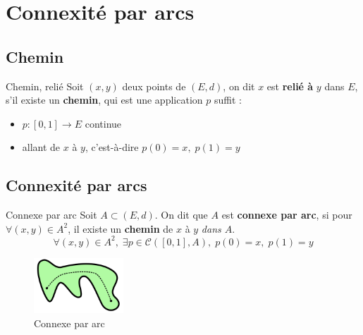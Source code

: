\newpage
\section{Connexité par arcs}

\subsection{Chemin} %

\begin{Definition}[colbacktitle=red!75!black]{Chemin, relié}{}
  Soit $(x,y)$ deux points de $(E,d)$, on dit $x$ est \textbf{relié à} $y$ dans $E$, s'il existe un \textbf{chemin}, qui est une application $p$ suffit :
\begin{itemize}

  \item $p:[0,1]\to E$ continue
  \item allant de $x$ à $y$, c'est-à-dire $p(0)=x,\; p(1)=y$

\end{itemize}
\end{Definition}

\subsection{Connexité par arcs} %
\label{sub:Connexité par arcs}

\begin{Definition}[colbacktitle=red!75!black]{Connexe par arc}{}
Soit $A \subset (E,d)$. On dit que $A$ est \textbf{connexe par arc}, si pour $\forall (x,y) \in A^2$, il existe un \textbf{chemin} de $x$ à $y$ \textit{dans $A$}.
\[
    \forall (x,y) \in A^2,\; \exists p \in \mathscr{C}([0,1], A),\; p(0) = x,\; p(1) = y
\]

\end{Definition}
\begin{figure}[H] %
    \centering
    \includegraphics[width=0.3\textwidth]{./assets/Connexe par arc.png}
    \caption{Connexe par arc}
    \label{fig:Connexe-par-arc}
\end{figure}

